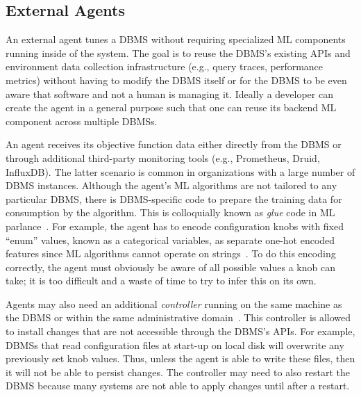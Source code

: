 \documentclass[11pt,times]{article}
\begin{document}
\subsection{External Agents}
\label{sec:ml-external}
An external agent tunes a DBMS without requiring specialized ML components running inside of the 
system. The goal is to reuse the DBMS's existing APIs and environment data collection 
infrastructure (e.g., query traces, performance metrics) without having to modify the DBMS itself 
or for the DBMS to be even aware that software and not a human is managing it.
Ideally a developer can create the agent in a general purpose such that one can reuse its backend 
ML component across multiple DBMSs.


An agent receives its objective function data either directly from the DBMS or through additional 
third-party monitoring tools (e.g., Prometheus, Druid, InfluxDB). The latter scenario is common in 
organizations with a large number of DBMS instances.
Although the agent's ML algorithms are not tailored to any particular DBMS, there is DBMS-specific 
code to prepare the training data for consumption by the algorithm. This is colloquially known as 
\textit{glue} code in ML parlance~\cite{sculley14}. 
For example, the agent has to encode configuration knobs with fixed ``enum'' values, 
known as a categorical variables, as separate one-hot 
encoded features since ML algorithms cannot operate on strings~\cite{vanaken17}. To do this encoding 
correctly, the agent must obviously be aware of all possible values a knob can take; it is too 
difficult and a waste of time to try to infer this on its own.

Agents may also need an additional \textit{controller} running on the same machine as the DBMS 
or within the same administrative domain~\cite{vanaken17}. This controller is allowed to install 
changes that are not accessible through the DBMS's APIs. For example, DBMSs that read configuration 
files at start-up on local disk will overwrite any previously set knob values. Thus, unless the 
agent is able to write these files, then it will not be able to persist changes. The controller 
may need to also restart the DBMS because many systems are not able to apply changes until 
after a restart.
\\ \vspace{-0.1in}
\end{document}
